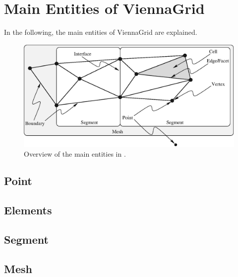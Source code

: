 \chapter{Main Entities of ViennaGrid} \label{chap:entities}


In the following, the main entities of ViennaGrid are explained.

\begin{figure}[tb]
 \includegraphics{figures/entities.eps}
 \caption{Overview of the main entities in \ViennaGrid.}
 \label{fig:entities}
\end{figure}


\section{Point}


\section{Elements}


\section{Segment}


\section{Mesh}
